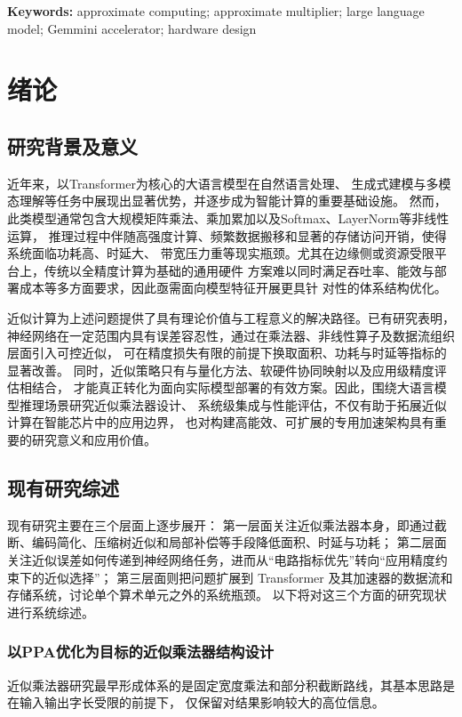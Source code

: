 \documentclass[12pt,a4paper,UTF8]{article}
\begin{document}
\noindent\textbf{Keywords:} approximate computing; approximate multiplier; large language model; Gemmini accelerator; hardware design

\clearpage
\section{绪论}

\subsection{研究背景及意义}
近年来，以Transformer为核心的大语言模型在自然语言处理、
生成式建模与多模态理解等任务中展现出显著优势，并逐步成为智能计算的重要基础设施。
然而，此类模型通常包含大规模矩阵乘法、乘加累加以及Softmax、LayerNorm等非线性运算，
推理过程中伴随高强度计算、频繁数据搬移和显著的存储访问开销，使得系统面临功耗高、时延大、
带宽压力重等现实瓶颈。尤其在边缘侧或资源受限平台上，传统以全精度计算为基础的通用硬件
方案难以同时满足吞吐率、能效与部署成本等多方面要求，因此亟需面向模型特征开展更具针
对性的体系结构优化。

近似计算为上述问题提供了具有理论价值与工程意义的解决路径。已有研究表明，
神经网络在一定范围内具有误差容忍性，通过在乘法器、非线性算子及数据流组织层面引入可控近似，
可在精度损失有限的前提下换取面积、功耗与时延等指标的显著改善。
同时，近似策略只有与量化方法、软硬件协同映射以及应用级精度评估相结合，
才能真正转化为面向实际模型部署的有效方案。因此，围绕大语言模型推理场景研究近似乘法器设计、
系统级集成与性能评估，不仅有助于拓展近似计算在智能芯片中的应用边界，
也对构建高能效、可扩展的专用加速架构具有重要的研究意义和应用价值。

\subsection{现有研究综述}
现有研究主要在三个层面上逐步展开：
第一层面关注近似乘法器本身，即通过截断、编码简化、压缩树近似和局部补偿等手段降低面积、时延与功耗；
第二层面关注近似误差如何传递到神经网络任务，进而从“电路指标优先”转向“应用精度约束下的近似选择”；
第三层面则把问题扩展到 Transformer 及其加速器的数据流和存储系统，讨论单个算术单元之外的系统瓶颈。
以下将对这三个方面的研究现状进行系统综述。

\subsubsection{以PPA优化为目标的近似乘法器结构设计}
近似乘法器研究最早形成体系的是固定宽度乘法和部分积截断路线，其基本思路是在输入输出字长受限的前提下，
仅保留对结果影响较大的高位信息。
\end{document}
